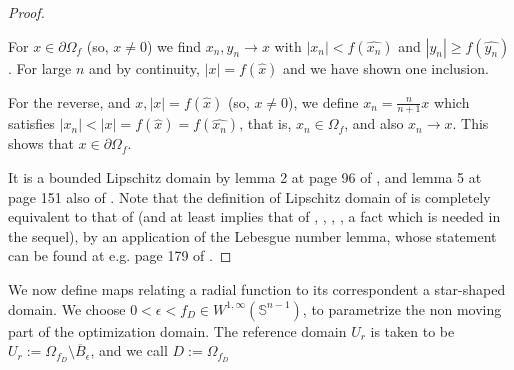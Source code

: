 \documentclass[english,a4paper,10pt,oneside]{scrbook}	%
\theoremstyle{break}
\newenvironment{mproof}[1][\proofname]{%
  \begin{proof}[#1]$ $\par\nobreak\ignorespaces
}{%
  \end{proof}
}
\renewcommand*{\proofname}{Proof}
\theoremstyle{remark}
\newcommand{\mS}{\mathbb{S}^{n-1}}
\newcommand{\xh}{\hat{x}}
\newcommand{\eps}{\epsilon}
\begin{document}
\begin{mproof}

For $x \in \partial \Omega_f$ (so, $x\neq 0$) we find $x_n, y_n \rightarrow x$ with $|x_n|<f(\widehat{x_n})$ and $|y_n|\geq f(\widehat{y_n})$. For large $n$ and by continuity, $|x| = f(\xh)$ and we have shown one inclusion.

For the reverse, and $x, |x|=f(\xh)$ (so, $x\neq 0$), we define $x_n = \frac{n}{n+1} x$ which satisfies $|x_n|<|x|=f(\xh)=f(\widehat{x_n})$, that is, $x_n \in \Omega_f$, and also $x_n\rightarrow x$. This shows that $x \in \partial \Omega_f$.

It is a bounded Lipschitz domain by lemma 2 at page 96 of \cite{burenkov}, and lemma 5 at page 151 also of \cite{burenkov}. Note that the definition of Lipschitz domain of \cite{burenkov} is completely equivalent to that of \cite{bello} (and at least implies that of \cite{mclean}, \cite{grisvard}, \cite{leoni}, \cite{adams}, a fact which is needed in the sequel), by an application of the Lebesgue number lemma, whose statement can be found at e.g. page 179 of \cite{munkres}.
\end{mproof}

We now define maps relating a radial function to its correspondent a star-shaped domain. We choose $0<\eps <f_D \in W^{1,\infty}(\mS)$, to parametrize the non moving part of the optimization domain. The reference domain $U_r$ is taken to be $U_r:=\Omega_{f_D}\setminus \overline{B}_\eps$, and we call $D:=\Omega_{f_D}$
\end{document}
